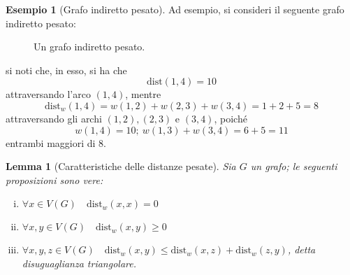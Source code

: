 \documentclass[14pt]{extreport}
\newtheorem{lemma}{Lemma}[subsection]
\theoremstyle{definition}
\theoremstyle{definition}
\newtheorem{example}{Esempio}[subsection]
\begin{document}
\begin{example}[Grafo indiretto pesato]
    Ad esempio, si consideri il seguente grafo indiretto pesato:

    \begin{figure}[H]
        \centering
        \caption{Un grafo indiretto pesato.}
    \end{figure}

    si noti che, in esso, si ha che $$\mathrm{dist}(1, 4) = 10$$ attraversando l'arco $(1, 4)$, mentre $$\mathrm{dist}_w(1, 4)=w(1, 2) + w(2, 3) + w(3, 4)=1 + 2 + 5 = 8$$ attraversando gli archi $(1, 2), (2, 3)$ e $(3, 4)$, poiché $$w(1, 4) = 10; \ w(1, 3) + w(3, 4) = 6 + 5 = 11$$ entrambi maggiori di $8$.
\end{example}

\begin{lemma}[Caratteristiche delle distanze pesate]
    \label{caratteristiche distanze pesate}
    Sia $G$ un grafo; le seguenti proposizioni sono vere:

    \begin{enumerate}[i)]
        \item $\forall x \in V(G) \quad \mathrm{dist}_w(x, x) = 0$
        \item $\forall x, y \in V(G) \quad \mathrm{dist}_w(x, y) \ge 0$
        \item $\forall x, y, z \in V(G) \quad \mathrm{dist}_w(x, y) \le \mathrm{dist}_w(x, z) + \mathrm{dist}_w(z, y)$, detta \textup{disuguaglianza triangolare}.
    \end{enumerate}
\end{lemma}
\end{document}
